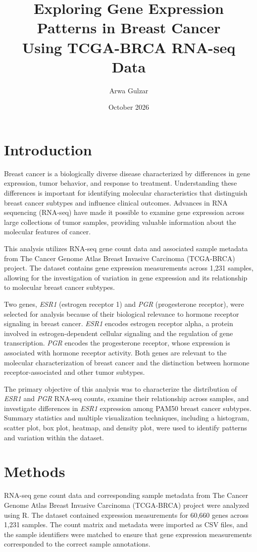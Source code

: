 \documentclass[11pt,letterpaper]{article}
\title{Exploring Gene Expression Patterns in Breast Cancer\\Using TCGA-BRCA RNA-seq Data}
\author{Arwa Gulzar}
\date{October 2026}
\begin{document}
\maketitle
\section{Introduction}
Breast cancer is a biologically diverse disease characterized by differences in gene expression, tumor behavior, and response to treatment. Understanding these differences is important for identifying molecular characteristics that distinguish breast cancer subtypes and influence clinical outcomes. Advances in RNA sequencing (RNA-seq) have made it possible to examine gene expression across large collections of tumor samples, providing valuable information about the molecular features of cancer.

This analysis utilizes RNA-seq gene count data and associated sample metadata from The Cancer Genome Atlas Breast Invasive Carcinoma (TCGA-BRCA) project. The dataset contains gene expression measurements across 1,231 samples, allowing for the investigation of variation in gene expression and its relationship to molecular breast cancer subtypes.

Two genes, \textit{ESR1} (estrogen receptor 1) and \textit{PGR} (progesterone receptor), were selected for analysis because of their biological relevance to hormone receptor signaling in breast cancer. \textit{ESR1} encodes estrogen receptor alpha, a protein involved in estrogen-dependent cellular signaling and the regulation of gene transcription. \textit{PGR} encodes the progesterone receptor, whose expression is associated with hormone receptor activity. Both genes are relevant to the molecular characterization of breast cancer and the distinction between hormone receptor-associated and other tumor subtypes.

The primary objective of this analysis was to characterize the distribution of \textit{ESR1} and \textit{PGR} RNA-seq counts, examine their relationship across samples, and investigate differences in \textit{ESR1} expression among PAM50 breast cancer subtypes. Summary statistics and multiple visualization techniques, including a histogram, scatter plot, box plot, heatmap, and density plot, were used to identify patterns and variation within the dataset.

\section{Methods}
RNA-seq gene count data and corresponding sample metadata from The Cancer Genome Atlas Breast Invasive Carcinoma (TCGA-BRCA) project were analyzed using R. The dataset contained expression measurements for 60,660 genes across 1,231 samples. The count matrix and metadata were imported as CSV files, and the sample identifiers were matched to ensure that gene expression measurements corresponded to the correct sample annotations.
\end{document}
